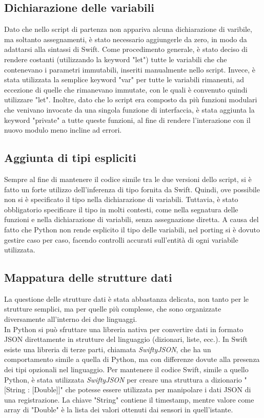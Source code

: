 \subsection{Dichiarazione delle variabili}

Dato che nello script di partenza non appariva alcuna dichiarazione di varibile,
ma soltanto assegnamenti, è stato necessario aggiungerle da zero, in modo da 
adattarsi alla sintassi di Swift. Come procedimento generale, è stato deciso
di rendere costanti (utilizzando la keyword "let") tutte le variabili che 
che contenevano i parametri immutabili, inseriti manualmente nello script.
Invece, è stata utilizzata la semplice keyword "var" per tutte le variabili 
rimanenti, ad eccezione di quelle che rimanevano immutate, con le quali è 
convenuto quindi utilizzare "let". Inoltre, dato che lo script era composto 
da più funzioni modulari che venivano invocate da una singola funzione di
interfaccia, è stata aggiunta la keyword "private" a tutte queste funzioni,
al fine di rendere l'interazione con il nuovo modulo meno incline ad errori.

\subsection{Aggiunta di tipi espliciti}

Sempre al fine di mantenere il codice simile tra le due versioni dello script,
si è fatto un forte utilizzo dell'inferenza di tipo fornita da Swift. Quindi,
ove possibile non si è specificato il tipo nella dichiarazione di variabili.
Tuttavia, è stato obbligatorio specificare il tipo in molti contesti, come
nella segnatura delle funzioni e nella dichiarazione di variabili, senza 
assegnazione diretta. A causa del fatto che Python non rende esplicito
il tipo delle variabili, nel porting si è dovuto gestire caso per caso,
facendo controlli accurati sull'entità di ogni variabile utilizzata.

\subsection{Mappatura delle strutture dati}

La questione delle strutture dati è stata abbastanza delicata, non tanto
per le strutture semplici, ma per quelle più complesse, che sono 
organizzate diversamente all'interno dei due linguaggi.\\
In Python si può sfruttare una libreria nativa per convertire dati in 
formato JSON direttamente in strutture del linguaggio (dizionari, liste, ecc.).
In Swift esiste una libreria di terze parti, chiamata \emph{SwiftyJSON}, che
ha un comportamento simile a quella di Python, ma con differenze dovute alla
presenza dei tipi opzionali nel linguaggio. Per mantenere il codice Swift, simile
a quello Python, è stata utilizzata \emph{SwiftyJSON} per creare una struttura a 
dizionario "[String : [Double]]" che potesse essere utilizzata per manipolare i 
dati JSON di una registrazione. La chiave "String" contiene il timestamp, mentre
valore come array di "Double" è la lista dei valori ottenuti dai sensori in 
quell'istante. %

